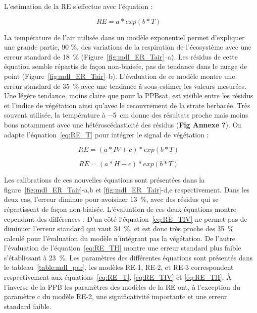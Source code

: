 

L'estimation de la RE s'effectue avec l'équation :

\begin{equation} \label{eq:RE_T}
RE = a*exp(b*T)
\end{equation}

La température de l'air utilisée dans un modèle exponentiel permet d'expliquer une grande partie, 90 \%, des variations de la respiration de l'écosystème avec une erreur standard de \SI{18}{\percent} (Figure~\ref{fig:mdl_ER_Tair}--a).
Les résidus de cette équation semble répartis de façon non-biaisée, pas de tendance dans le nuage de point (Figure~\ref{fig:mdl_ER_Tair}--b).
L'évaluation de ce modèle montre une erreur standard de \SI{35}{\percent} avec une tendance à sous-estimer les valeurs mesurées.
Une légère tendance, moins claire que pour la PPBsat, est visible entre les résidus et l'indice de végétation ainsi qu'avec le recouvrement de la strate herbacée.
Très souvent utilisée, la température à \SI{-5}{\centi\metre} donne des résultats proche mais moins bons notamment avec une hétéroscédasticité des résidus (\textbf{Fig Annexe ?}).
On adapte l'équation~\ref{eq:RE_T} pour intégrer le signal de végétation :

\begin{equation} \label{eq:RE_TIV}
RE = (a*IV + c)*exp(b*T)
\end{equation}

\begin{equation} \label{eq:RE_TH}
RE = (a*H + c)*exp(b*T)
\end{equation}

Les calibrations de ces nouvelles équations sont présentées dans la figure~\ref{fig:mdl_ER_Tair}-a,b et \ref{fig:mdl_ER_Tair}-d,e respectivement.
Dans les deux cas, l'erreur diminue pour avoisiner \SI{13}{\percent}, avec des résidus qui se répartissent de façon non-biaisée.
L'évaluation de ces deux équations montre cependant des différences :
D'un côté l'équation~\ref{eq:RE_TIV} ne permet pas de diminuer l'erreur standard qui vaut \SI{34}{\percent}, et est donc très proche des \SI{35}{\percent} calculé pour l'évaluation du modèle n'intégrant pas la végétation.
De l'autre l'évaluation de l'équation~\ref{eq:RE_TH} montre une erreur standard plus faible s'établissant à \SI{23}{\percent}.
Les paramètres des différentes équations sont présentés dans le tableau~\ref{table:mdl_par}, les modèles RE-1, RE-2, et RE-3 correspondent respectivement aux équations~\ref{eq:RE_T}, \ref{eq:RE_TIV} et \ref{eq:RE_TH}.
À l'inverse de la PPB les paramètres des modèles de la RE ont, à l'exception du paramètre c du modèle RE-2, une significativité importante et une erreur standard faible.

